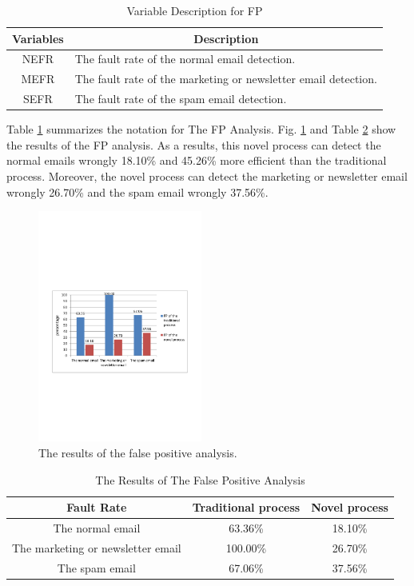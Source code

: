 \documentclass[conference]{IEEEtran}
\begin{document}
\begin{table}[!t]
\renewcommand{\arraystretch}{1.2}
\caption{Variable Description for FP}
\label{table_variableFP}
\centering
\begin{tabular}{c|l}
\hline
\bfseries Variables & \multicolumn{1}{c}{\bfseries Description}\\
\hline
NEFR & The fault rate of the normal email detection.\\
\hline
MEFR & The fault rate of the marketing or newsletter email detection.\\
\hline
SEFR & The fault rate of the spam email detection.\\
\hline
\end{tabular}
\end{table}

Table \ref{table_variableFP} summarizes the notation for The FP Analysis.
Fig. \ref{fig:resultFP} and Table \ref{table_resultsFP} show the results of the FP
analysis.
As a
results, this novel process can detect the normal emails wrongly 18.10\% and 45.26\% more efficient than the traditional process.
Moreover, the novel process can detect the marketing or newsletter email wrongly 26.70\% and the spam email wrongly 37.56\%. 

\begin{figure}
\centering
\includegraphics[width=0.48\textwidth]{9.pdf}
\caption{The results of the false positive analysis.}
\label{fig:resultFP}
\end{figure}

\begin{table}[!t]
\renewcommand{\arraystretch}{1.2}
\caption{The Results of The False Positive Analysis}
\label{table_resultsFP}
\centering
\begin{tabular}{c|c|c}
\hline
\bfseries Fault Rate & \bfseries Traditional process & \bfseries Novel process\\
\hline
The normal email & 63.36\% & 18.10\%\\
\hline
The marketing or newsletter email & 100.00\% & 26.70\%\\
\hline
The spam email & 67.06\% & 37.56\%\\
\hline
\end{tabular}
\end{table}
\end{document}
